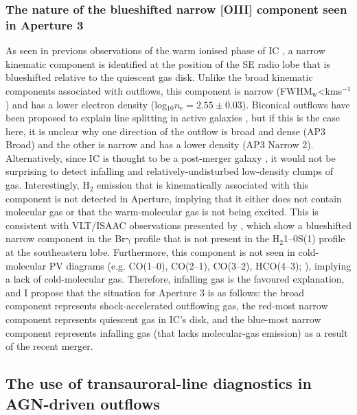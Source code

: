 \subsubsection{The nature of the blueshifted narrow [OIII] component seen in Aperture 3}
\label{section: xshooter_ic5063: discussion: ap3_narrow_component}

As seen in previous observations of the warm ionised phase of IC \citep{Morganti2007}, a narrow kinematic component is identified at the position of the SE radio lobe that is blueshifted relative to the quiescent gas disk. Unlike the broad kinematic components associated with outflows, this component is narrow (\mbox{FWHM$_\mathrm{w}$\;\textless{}\;km\;s$^{-1}$}) and has a lower electron density (log$_{10}n_\mathrm{e}=2.55\pm0.03$). Biconical outflows have been proposed to explain line splitting in active galaxies \citep{Walker1968, Cecil1990}, but if this is the case here, it is unclear why one direction of the outflow is broad and dense (AP3 Broad) and the other is narrow and has a lower density (AP3 Narrow 2). Alternatively, since IC is thought to be a post-merger galaxy \citep{Morganti1998}, it would not be surprising to detect infalling and relatively-undisturbed low-density clumps of gas. Interestingly, H$_2$ emission that is kinematically associated with this component is not detected in Aperture, implying that it either does not contain molecular gas or that the warm-molecular gas is not being excited. This is consistent with VLT/ISAAC observations presented by \citet{Tadhunter2014}, which show a blueshifted narrow component in the Br$\mathrm{\gamma}$ profile that is not present in the H$_2$1--0S(1) profile at the southeastern lobe. Furthermore, this component is not seen in cold-molecular PV diagrams (e.g. CO(1--0), CO(2--1), CO(3--2), HCO(4--3); \citealt{Morganti2015, Oosterloo2017}), implying a lack of cold-molecular gas. Therefore, infalling gas is the favoured explanation, and I propose that the situation for Aperture 3 is as follows: the broad component represents shock-accelerated outflowing gas, the red-most narrow component represents quiescent gas in IC's disk, and the blue-most narrow component represents infalling gas (that lacks molecular-gas emission) as a result of the recent merger.

\vfill

\subsection{The use of transauroral-line diagnostics in AGN-driven outflows}
\label{section: xshooter_ic5063: discussion: transauroral_lines}

